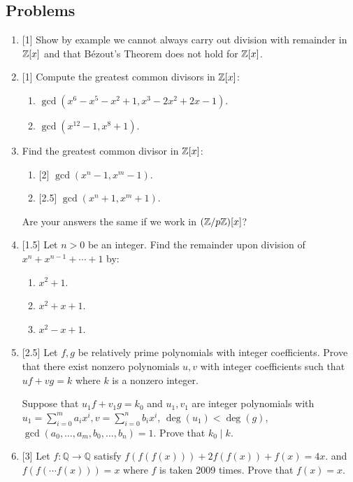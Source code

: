 \subsection{Problems}
\begin{enumerate}
\item{}[1] Show by example we cannot always carry out division with remainder in $\mathbb{Z}[x]$ and that B\'ezout's Theorem does not hold for $\mathbb{Z}[x]$. 

\item{}[1] Compute the greatest common divisors in $\mathbb{Z}[x]$:
\begin{enumerate}
\item $\gcd(x^6-x^5-x^2+1, x^3-2x^2+2x-1)$.
\item $\gcd(x^{12}-1,x^8+1)$.
\end{enumerate}

\item{} Find the greatest common divisor in $\mathbb{Z}[x]$:
\begin{enumerate}
\item{}[2] $\gcd(x^n-1,x^m-1)$.
\item{}[2.5] $\gcd(x^n+1,x^m+1)$.
\end{enumerate}
Are your answers the same if we work in $(\mathbb{Z}/p\mathbb{Z})[x]$?

\item{}[1.5] Let $n>0$ be an integer.  Find the remainder upon division of
$x^n+x^{n-1}+\cdots+1$ by:
\begin{enumerate}
\item $x^2+1$.
\item $x^2+x+1$.
\item $x^2-x+1$.
\end{enumerate}

\item{}[2.5] Let $f,g$ be relatively prime polynomials with integer coefficients. Prove that there exist nonzero polynomials $u,v$ with integer coefficients such that $uf+vg=k$ where $k$ is a nonzero integer. %

Suppose that $u_1f+v_1g=k_0$ and $u_1,v_1$ are integer polynomials with $u_1=\sum_{i= 0}^m a_ix^i,v=\sum_{i=0}^n b_ix^i$, $\deg(u_1)<\deg(g)$, $\gcd(a_0,\ldots, a_m,b_0,\ldots, b_n)=1$. Prove that $k_0\mid k$.

\item{}[3] Let $f:\mathbb Q\to \mathbb Q$ satisfy $f(f(f(x)))+2f(f(x))+f(x)=4x$. and $f(f(\cdots f(x)))=x$ where $f$ is taken 2009 times. Prove that $f(x)=x$.


\end{enumerate}
